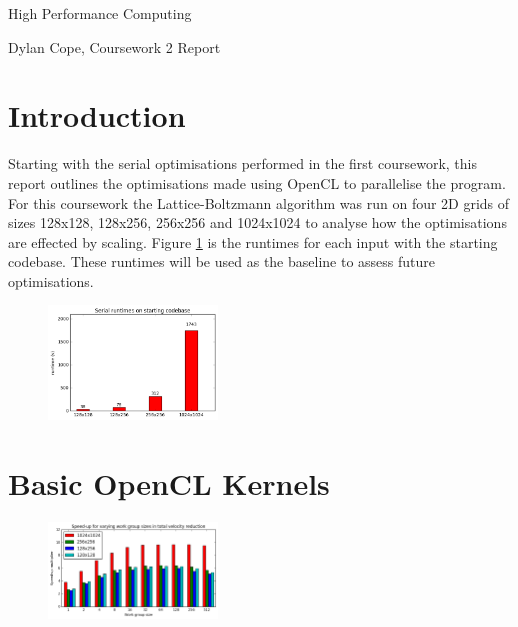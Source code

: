 \documentclass[12pt, a4paper]{article}
\begin{document}
  \vspace{.1in}
	\begin{center}
	{ \Large High Performance Computing }

  \end{center}
  \begin{center}

	Dylan Cope, Coursework 2 Report

	\vspace{.1in}

	\end{center}

  \section*{Introduction}

  \begin{multicols}{2}

    Starting with the serial optimisations performed in the first coursework, this report outlines the optimisations made using OpenCL to parallelise the program. For this coursework the Lattice-Boltzmann algorithm was run on four 2D grids of sizes 128x128, 128x256, 256x256 and 1024x1024 to analyse how the optimisations are effected by scaling. Figure \ref{serial} is the runtimes for each input with the starting codebase. These runtimes will be used as the baseline to assess future optimisations.

    \begin{figure}[H]
      \caption{} \vspace{-0.8cm}
      \label{serial}
      \begin{center}
        \includegraphics[width=0.4\textwidth]{figures/serial}
      \end{center}
    \end{figure}

  \end{multicols}

  \section*{Basic OpenCL Kernels}

  \begin{multicols}{2}

    \begin{figure}[H]
      \caption{} \vspace{-0.8cm}
      \label{wgs}
      \begin{center}
        \includegraphics[width=0.4\textwidth]{figures/workgroupsize}
      \end{center}
    \end{figure}

  \end{multicols}
\end{document}
